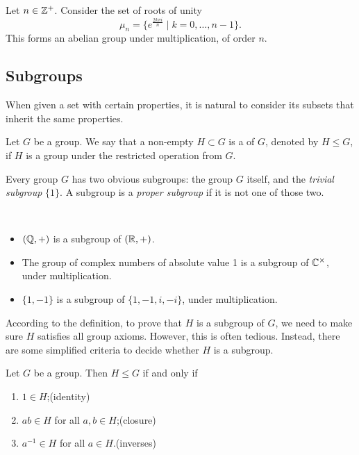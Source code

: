 \begin{example}
Let $n\in\mathbb Z^+$. Consider the set of roots of unity
\[\mu_n=\{e^\frac{2k\pi i}{n}\mid k=0,\dots,n-1\}.\]
This forms an abelian group under multiplication, of order $n$.
\end{example}

\subsection{Subgroups}
When given a set with certain properties, it is natural to consider its subsets that inherit the same properties.

\begin{definition}[Subgroup]
Let $G$ be a group. We say that a non-empty $H\subset G$ is a  of $G$, denoted by $H\le G$, if $H$ is a group under the restricted operation from $G$.
\end{definition}

Every group $G$ has two obvious subgroups: the group $G$ itself, and the \emph{trivial subgroup} $\{1\}$. A subgroup is a \emph{proper subgroup} if it is not one of those two.

\begin{example} \
\begin{itemize}
\item $(\mathbb Q,+)$ is a subgroup of $(\mathbb R,+)$.
\item The group of complex numbers of absolute value 1 is a subgroup of $\mathbb C^\times$, under multiplication.
\item $\{1,-1\}$ is a subgroup of $\{1,-1,i,-i\}$, under multiplication.
\end{itemize}
\end{example}

According to the definition, to prove that $H$ is a subgroup of $G$, we need to make sure $H$ satisfies all group axioms. However, this is often tedious. Instead, there are some simplified criteria to decide whether $H$ is a subgroup.

\begin{lemma}
Let $G$ be a group. Then $H\le G$ if and only if
\begin{enumerate}[label=(\roman*)]
\item $1\in H$;\hfill(identity)
\item $ab\in H$ for all $a,b\in H$;\hfill(closure)
\item $a^{-1}\in H$ for all $a\in H$.\hfill(inverses)
\end{enumerate}
\end{lemma}

